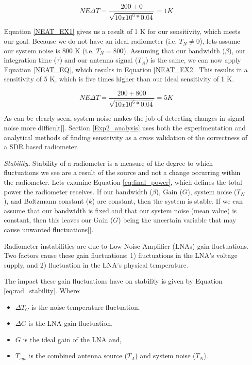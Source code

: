 \begin{equation} \label{NEAT_EX1}
NE\Delta T=\frac{200 + 0}{\sqrt{10 x 10^6 * 0.04}} = 1 K 
\end{equation}

Equation \ref{NEAT_EX1} gives us a result of 1 K for our sensitivity, which meets our goal.  Because we do not have an ideal radiometer (i.e. $T_N \neq 0$), lets assume our system noise is 800 K (i.e. $T_N = 800$).  Assuming that our bandwidth ($\beta$), our integration time ($\tau$) and our antenna signal ($T_A$) is the same, we can now apply Equation \ref{NEAT_EQ}, which results in Equation \ref{NEAT_EX2}.  This results in a sensitivity of 5 K, which is five times higher than our ideal sensitivity of 1 K. 

\begin{equation} \label{NEAT_EX2}
NE\Delta T=\frac{200 + 800}{\sqrt{10 x 10^6 * 0.04}} = 5 K 
\end{equation}

As can be clearly seen, system noise makes the job of detecting changes in signal noise more difficult[\cite{skou}].  Section \ref{Exp2_analysis} uses both the experimentation and analytical methods of finding sensitivity as a cross validation of the correctness of a SDR based radiometer.

\emph{Stability.}  Stability of a radiometer is a measure of the degree to which fluctuations we see are a result of the source and not a change occurring within the radiometer.  Lets examine Equation \ref{eq:final_power}, which defines the total power the radiometer receives.  If our bandwidth ($\beta$), Gain ($G$), system noise ($T_N$), and Boltzmann constant ($k$) are constant, then the system is stable.  If we can assume that our bandwidth is fixed and that our system noise (mean value) is constant, then this leaves our Gain ($G$) being the uncertain variable that may cause unwanted fluctuations[\cite{Evans}]. 

Radiometer instabilities are due to Low Noise Amplifier (LNAs) gain fluctuations.  Two factors cause these gain fluctuations: 1) fluctuations in the LNA's voltage supply, and 2) fluctuation in the LNA's physical temperature.  

The impact these gain fluctuations have on stability is given by Equation \ref{eq:rad_stability}.  Where:

\begin{itemize}
\item $\Delta T_G$ is the noise temperature fluctuation,
\item $\Delta G$ is the LNA gain fluctuation,
\item $G$ is the ideal gain of the LNA and,
\item $T_{sys}$ is the combined antenna source ($T_A$) and system noise ($T_N$).
\end{itemize}

